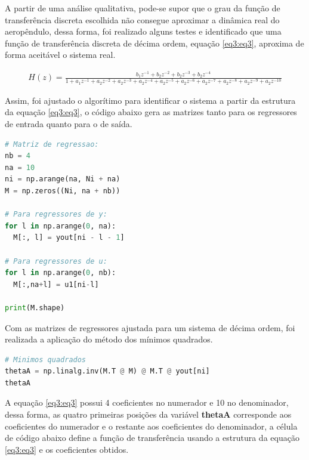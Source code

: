 A partir de uma análise qualitativa, pode-se supor que o grau da função de transferência discreta escolhida não consegue aproximar a dinâmica real do aeropêndulo, dessa forma, foi realizado alguns testes e identificado que uma função de transferência discreta de décima ordem, equação \ref{eq3:eq3}, aproxima de forma aceitável o sistema real.

\begin{align}
H(z) = \frac{b_1z^{-1}+b_2z^{-2}+b_2z^{-3}+b_2z^{-4}}{1+a_1z^{-1}+a_2z^{-2}+a_2z^{-3}+a_2z^{-4}+a_2z^{-5}+a_2z^{-6}+a_2z^{-7}+a_2z^{-8}+a_2z^{-9}+a_2z^{-10}}\label{eq3:eq3}
\end{align}


Assim, foi ajustado o algorítimo para identificar o sistema a partir da estrutura da equação \ref{eq3:eq3}, o código abaixo gera as matrizes tanto para os regressores de entrada quanto para o de saída. 

\vspace{0.5cm}

\begin{lstlisting}[language=python]
# Matriz de regressao:
nb = 4
na = 10
ni = np.arange(na, Ni + na)
M = np.zeros((Ni, na + nb))

# Para regressores de y:
for l in np.arange(0, na):
  M[:, l] = yout[ni - l - 1]

# Para regressores de u:
for l in np.arange(0, nb):
  M[:,na+l] = u1[ni-l]

print(M.shape)
\end{lstlisting}


Com as matrizes de regressores ajustada para um sistema de décima ordem, foi realizada a aplicação do método dos mínimos quadrados.

\vspace{0.5cm}

\begin{lstlisting}[language=python]
# Minimos quadrados
thetaA = np.linalg.inv(M.T @ M) @ M.T @ yout[ni]
thetaA
\end{lstlisting}

A equação \ref{eq3:eq3} possui 4 coeficientes no numerador e 10 no denominador, dessa forma, as quatro primeiras posições da variável  \textbf{thetaA} corresponde aos coeficientes do numerador e o restante aos coeficientes do denominador, a célula de código abaixo define a função de transferência usando a estrutura da equação \ref{eq3:eq3} e os coeficientes obtidos.

\vspace{0.5cm}

